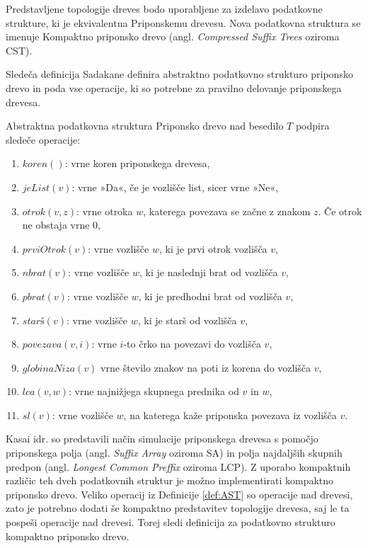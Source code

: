 Predstavljene topologije dreves bodo uporabljene za izdelavo podatkovne strukture, ki je ekvivalentna Priponskemu drevesu. Nova podatkovna struktura se imenuje Kompaktno priponsko drevo (angl. \textit{Compressed Suffix Trees} oziroma CST).

Sledeča definicija Sadakane \cite{Sadakane2007} definira abstraktno podatkovno strukturo priponsko drevo in poda vse operacije, ki so potrebne za pravilno delovanje priponskega drevesa.

\begin{defi}\label{def:AST}
    Abstraktna podatkovna struktura Priponsko drevo nad besedilo $T$ podpira sledeče operacije:
    \begin{enumerate}
        \item $koren()$: vrne koren priponskega drevesa,
        \item $jeList(v)$: vrne »Da«, če je vozlišče list, sicer vrne »Ne«,
        \item $otrok(v,z)$: vrne otroka $w$, katerega povezava se začne z znakom $z$. Če otrok ne obstaja vrne 0,
        \item $prviOtrok(v)$: vrne vozlišče $w$, ki je prvi otrok vozlišča $v$,
        \item $nbrat(v)$: vrne vozlišče $w$, ki je naslednji brat od vozlišča $v$,
        \item $pbrat(v)$: vrne vozlišče $w$, ki je predhodni brat od vozlišča $v$,
        \item $star\textit{š}(v)$: vrne vozlišče $w$, ki je starš od vozlišča $v$,
        \item $povezava(v,i)$: vrne $i$-to črko na povezavi do vozlišča $v$,
        \item $globinaNiza(v)$ vrne število znakov na poti iz korena do vozlišča $v$,
        \item $lca(v,w)$: vrne najnižjega skupnega prednika od $v$ in $w$,
        \item $sl(v)$: vrne vozlišče $w$, na katerega kaže priponska povezava iz vozlišča $v$.
    \end{enumerate}
\end{defi}

Kasai idr. \cite{Kasai2001} so predstavili način simulacije priponskega drevesa s pomočjo priponskega polja (angl. \textit{Suffix Array} oziroma SA) in polja najdaljših skupnih predpon (angl. \textit{Longest Common Preffix} oziroma LCP). Z uporabo kompaktnih različic teh dveh podatkovnih struktur je možno implementirati kompaktno priponsko drevo. Veliko operacij iz Definicije \ref{def:AST} so operacije nad drevesi, zato je potrebno dodati še kompaktno predstavitev topologije drevesa, saj le ta pospeši operacije nad drevesi. Torej sledi definicija za podatkovno strukturo kompaktno priponsko drevo.

